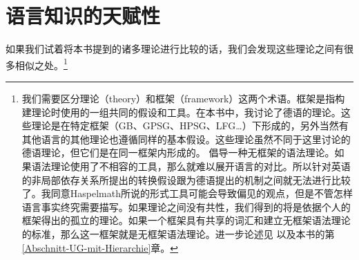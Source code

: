 %

\chapter{语言知识的天赋性}
\label{Abschnitt-Angeborenheit}\label{chap-innateness}
%

如果我们试着将本书提到的诸多理论进行比较的话，我们会发现这些理论之间有很多相似之处。\footnote{\label{fn-ffs}%
我们需要区分理论（theory）和框架（framework）这两个术语。框架是指构建理论时使用的一组共同的假设和工具。在本书中，我讨论了德语的理论。这些理论是在特定框架（GB、GPSG、HPSG、LFG\ldots）下形成的，另外当然有其他语言的其他理论也遵循同样的基本假设。这些理论虽然不同于这里讨论的德语理论，但它们是在同一框架内形成的。 \citet{Haspelmath2010c}倡导一种无框架的语法理论。如果语法理论使用了不相容的工具，那么就难以展开语言的对比。所以针对英语的非局部依存关系所提出的转换假设跟为德语提出的\slaschc 机制之间就无法进行比较了。我同意Haspelmath所说的形式工具可能会导致偏见的观点，但是不管怎样语言事实终究需要描写。如果理论之间没有共性，我们得到的将是依据个人的框架得出的孤立的理论。如果一个框架具有共享的词汇和建立无框架语法理论的标准，那么这一框架就是无框架语法理论。进一步论述见 \citet{MuellerCoreGram}以及本书的第\ref{Abschnitt-UG-mit-Hierarchie}章。
}

